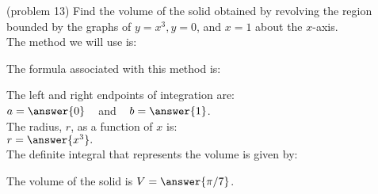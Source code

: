 \documentclass[handout]{ximera}
\begin{document}
\begin{problem}(problem 13)
Find the volume of the solid obtained by revolving the region bounded by the graphs of $y = x^3, y = 0$, and $x = 1$ about the $x$-axis.\\
The method we will use is:
\begin{multipleChoice}
\end{multipleChoice}

The formula associated with this method is:
\begin{multipleChoice}
\end{multipleChoice}

The left and right endpoints of integration are:\\
$a = \answer{0}\;\;\;$ and $\;\;\; b = \answer{1}$.\\
The radius, $r$, as a function of $x$ is:\\
$r = \answer{x^3}.$\\

The definite integral that represents the volume is given by:\\
\begin{multipleChoice}
\end{multipleChoice}

The volume of the solid is $V = \answer{\pi/7}$.

\end{problem}
\end{document}
